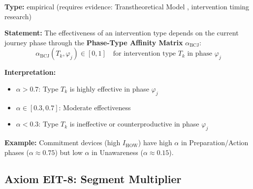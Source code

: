 \begin{tcolorbox}[colback=blue!5!white, colframe=blue!75!black,
    title=\textbf{Axiom EIT-7: Phase-Type Affinity}]

\textbf{Type:} empirical (requires evidence: Transtheoretical Model \citep{PAP-prochaska1992stages}, intervention timing research)

\textbf{Statement:} The effectiveness of an intervention type depends on the current journey phase through the \textbf{Phase-Type Affinity Matrix} $\alpha_{\text{BCJ}}$:
\begin{equation}
\boxed{\alpha_{\text{BCJ}}(T_k, \varphi_j) \in [0,1] \quad \text{for intervention type } T_k \text{ in phase } \varphi_j}
\label{eq:ie-phase-affinity}
\end{equation}

\textbf{Interpretation:}
\begin{itemize}[nosep]
    \item $\alpha > 0.7$: Type $T_k$ is highly effective in phase $\varphi_j$
    \item $\alpha \in [0.3, 0.7]$: Moderate effectiveness
    \item $\alpha < 0.3$: Type $T_k$ is ineffective or counterproductive in phase $\varphi_j$
\end{itemize}

\textbf{Example:} Commitment devices (high $I_{\text{HOW}}$) have high $\alpha$ in Preparation/Action phases ($\alpha \approx 0.75$) but low $\alpha$ in Unawareness ($\alpha \approx 0.15$).

\end{tcolorbox}

\subsection{Axiom EIT-8: Segment Multiplier}

